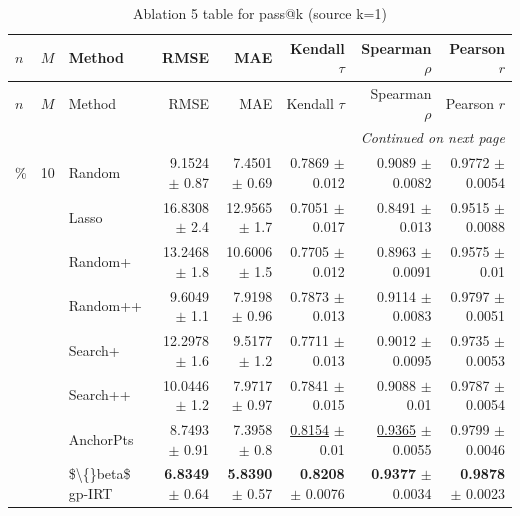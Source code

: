 \footnotesize
\setlength{\tabcolsep}{2pt}
\renewcommand{\arraystretch}{1.05}
\setlength{\LTpre}{0pt}
\setlength{\LTpost}{0pt}
\setlength{\LTleft}{\fill}
\setlength{\LTright}{\fill}
\begin{longtable}{llp{}rrrrr}
\caption{Ablation 5 table for pass@k (source k=1)}\label{tab:ablation\_5\_passk\_k1}\\
\toprule
$n$ & $M$ & Method & RMSE & MAE & Kendall $\tau$ & Spearman $\rho$ & Pearson $r$ \\
\midrule
\endfirsthead
\toprule
$n$ & $M$ & Method & RMSE & MAE & Kendall $\tau$ & Spearman $\rho$ & Pearson $r$ \\
\midrule
\endhead
\midrule
\multicolumn{8}{r}{\emph{Continued on next page}} \\
\midrule
\endfoot
\bottomrule
\endlastfoot
5\% & 10 & Random & 9.1524 {\scriptsize $\pm$ 0.87} & 7.4501 {\scriptsize $\pm$ 0.69} & 0.7869 {\scriptsize $\pm$ 0.012} & 0.9089 {\scriptsize $\pm$ 0.0082} & 0.9772 {\scriptsize $\pm$ 0.0054} \\
 &  & Lasso & 16.8308 {\scriptsize $\pm$ 2.4} & 12.9565 {\scriptsize $\pm$ 1.7} & 0.7051 {\scriptsize $\pm$ 0.017} & 0.8491 {\scriptsize $\pm$ 0.013} & 0.9515 {\scriptsize $\pm$ 0.0088} \\
 &  & Random+ & 13.2468 {\scriptsize $\pm$ 1.8} & 10.6006 {\scriptsize $\pm$ 1.5} & 0.7705 {\scriptsize $\pm$ 0.012} & 0.8963 {\scriptsize $\pm$ 0.0091} & 0.9575 {\scriptsize $\pm$ 0.01} \\
 &  & Random++ & 9.6049 {\scriptsize $\pm$ 1.1} & 7.9198 {\scriptsize $\pm$ 0.96} & 0.7873 {\scriptsize $\pm$ 0.013} & 0.9114 {\scriptsize $\pm$ 0.0083} & 0.9797 {\scriptsize $\pm$ 0.0051} \\
 &  & Search+ & 12.2978 {\scriptsize $\pm$ 1.6} & 9.5177 {\scriptsize $\pm$ 1.2} & 0.7711 {\scriptsize $\pm$ 0.013} & 0.9012 {\scriptsize $\pm$ 0.0095} & 0.9735 {\scriptsize $\pm$ 0.0053} \\
 &  & Search++ & 10.0446 {\scriptsize $\pm$ 1.2} & 7.9717 {\scriptsize $\pm$ 0.97} & 0.7841 {\scriptsize $\pm$ 0.015} & 0.9088 {\scriptsize $\pm$ 0.01} & 0.9787 {\scriptsize $\pm$ 0.0054} \\
 &  & AnchorPts & 8.7493 {\scriptsize $\pm$ 0.91} & 7.3958 {\scriptsize $\pm$ 0.8} & \underline{0.8154} {\scriptsize $\pm$ 0.01} & \underline{0.9365} {\scriptsize $\pm$ 0.0055} & 0.9799 {\scriptsize $\pm$ 0.0046} \\
 &  & \$\textbackslash\{\}beta\$ gp-IRT & \textbf{6.8349} {\scriptsize $\pm$ 0.64} & \textbf{5.8390} {\scriptsize $\pm$ 0.57} & \textbf{0.8208} {\scriptsize $\pm$ 0.0076} & \textbf{0.9377} {\scriptsize $\pm$ 0.0034} & \textbf{0.9878} {\scriptsize $\pm$ 0.0023} \\

\end{longtable}
